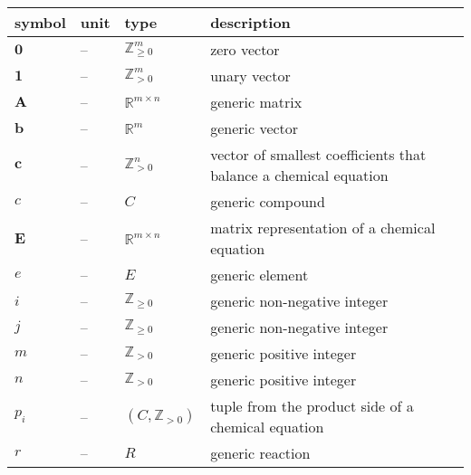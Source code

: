 \documentclass[12pt]{article}
\newcommand*{\nonnegInt}{\mathbb{Z}_{\geq 0}}
\newcommand*{\posInt}{\mathbb{Z}_{> 0}}
\begin{document}
\noindent \begin{tabularx}{\textwidth}{l l l X} \toprule
  \textbf{symbol} & \textbf{unit} & \textbf{type}             & \textbf{description}                                \\
  \midrule
  $\textbf{0}$    & --            & $\nonnegInt^{m}$          & zero vector                                         \\
  $\textbf{1}$    & --            & $\posInt^{m}$             & unary vector                                        \\
  $\textbf{A}$    & --            & $\mathbb{R}^{m \times n}$ & generic matrix                                      \\
  $\textbf{b}$    & --            & $\mathbb{R}^{m}$          & generic vector                                      \\
  $\textbf{c}$    & --            & $\posInt^{n}$             & vector of smallest coefficients
  that balance a chemical equation                                                                                  \\
  $c$             & --            & $C$                       & generic compound                                    \\
  $\textbf{E}$    & --            & $\mathbb{R}^{m \times n}$ & matrix representation of a chemical equation        \\
  $e$             & --            & $E$                       & generic element                                     \\
  $i$             & --            & $\nonnegInt$              & generic non-negative integer                        \\
  $j$             & --            & $\nonnegInt$              & generic non-negative integer                        \\
  $m$             & --            & $\posInt$                 & generic positive integer                            \\
  $n$             & --            & $\posInt$                 & generic positive integer                            \\
  $p_i$           & --            & $(C, \posInt)$            & tuple from the product side of a chemical equation  \\
  $r$             & --            & $R$                       & generic reaction                                    \\

\end{tabularx}
\end{document}
